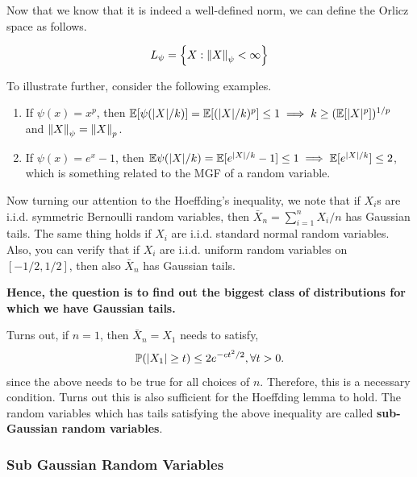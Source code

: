 \documentclass[12pt]{article}
\begin{document}
Now that we know that it is indeed a well-defined norm, we can define the Orlicz space as follows.

\begin{equation*}
    L_\psi = \left\{ X: \left\Vert X \right\Vert_\psi < \infty \right\}
\end{equation*}

To illustrate further, consider the following examples.

\begin{enumerate}
    \item If $\psi(x) = x^p$, then $\mathbb{E}[\psi(|X|/k)] = \mathbb{E}[(|X|/k)^p] \leq 1 \implies k \geq (\mathbb{E}[|X|^p])^{1/p}$ and $\left\Vert X \right\Vert_\psi = \left\Vert X \right\Vert_p$.
    \item If $\psi(x) = e^x - 1$, then $\mathbb{E}\psi(|X|/k) = \mathbb{E}[e^{|X|/k} - 1] \leq 1 \implies \mathbb{E}[e^{\left\lvert X \right\rvert/k}] \leq 2$, which is something related to the MGF of a random variable.
\end{enumerate}

Now turning our attention to the Hoeffding's inequality, we note that if $X_i$s are i.i.d. symmetric Bernoulli random variables, then $\bar{X}_n = \sum_{i=1}^n X_i / n$ has Gaussian tails. The same thing holds if $X_i$ are i.i.d. standard normal random variables. Also, you can verify that if $X_i$ are i.i.d. uniform random variables on $[-1/2,1/2]$, then also $\bar{X}_n$ has Gaussian tails.

\textbf{Hence, the question is to find out the biggest class of distributions for which we have Gaussian tails.}

Turns out, if $n = 1$, then $\bar{X}_n = X_1$ needs to satisfy,
\begin{equation*}
    \mathbb{P}(\left\lvert X_1 \right\rvert \geq t) \leq 2e^{-ct^2/2}, \forall t > 0.
\end{equation*}
\noindent since the above needs to be true for all choices of $n$. Therefore, this is a necessary condition. Turns out this is also sufficient for the Hoeffding lemma to hold. The random variables which has tails satisfying the above inequality are called \textbf{sub-Gaussian random variables}.


\subsubsection{Sub Gaussian Random Variables}
\end{document}
